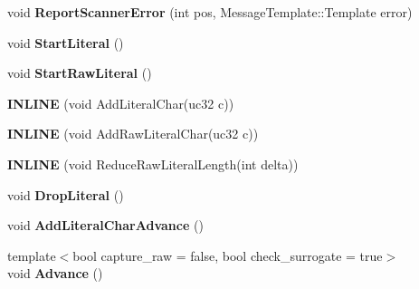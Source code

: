 \begin{DoxyCompactItemize}
\item 
void {\bfseries Report\+Scanner\+Error} (int pos, Message\+Template\+::\+Template error)\hypertarget{classv8_1_1internal_1_1_scanner_a804164d17098a4f357f2f67b0043c6aa}{}\label{classv8_1_1internal_1_1_scanner_a804164d17098a4f357f2f67b0043c6aa}

\item 
void {\bfseries Start\+Literal} ()\hypertarget{classv8_1_1internal_1_1_scanner_ac8091e0cf0fed8cfa51c626fa0cb4903}{}\label{classv8_1_1internal_1_1_scanner_ac8091e0cf0fed8cfa51c626fa0cb4903}

\item 
void {\bfseries Start\+Raw\+Literal} ()\hypertarget{classv8_1_1internal_1_1_scanner_a33bcfb5696e63e7afe9ce0d7261fc3af}{}\label{classv8_1_1internal_1_1_scanner_a33bcfb5696e63e7afe9ce0d7261fc3af}

\item 
{\bfseries I\+N\+L\+I\+NE} (void Add\+Literal\+Char(uc32 c))\hypertarget{classv8_1_1internal_1_1_scanner_adf7e3f741d064a21fe59bb83597496a0}{}\label{classv8_1_1internal_1_1_scanner_adf7e3f741d064a21fe59bb83597496a0}

\item 
{\bfseries I\+N\+L\+I\+NE} (void Add\+Raw\+Literal\+Char(uc32 c))\hypertarget{classv8_1_1internal_1_1_scanner_a55d9a8bcd08eba1320c650e71dc0e865}{}\label{classv8_1_1internal_1_1_scanner_a55d9a8bcd08eba1320c650e71dc0e865}

\item 
{\bfseries I\+N\+L\+I\+NE} (void Reduce\+Raw\+Literal\+Length(int delta))\hypertarget{classv8_1_1internal_1_1_scanner_a0974013915b54b2c323b1bed1894a3ae}{}\label{classv8_1_1internal_1_1_scanner_a0974013915b54b2c323b1bed1894a3ae}

\item 
void {\bfseries Drop\+Literal} ()\hypertarget{classv8_1_1internal_1_1_scanner_ab513c42742b0025b3b4f59537fd5ca0f}{}\label{classv8_1_1internal_1_1_scanner_ab513c42742b0025b3b4f59537fd5ca0f}

\item 
void {\bfseries Add\+Literal\+Char\+Advance} ()\hypertarget{classv8_1_1internal_1_1_scanner_ac0cebc03a584a5bf5b74b4f3ff2b168b}{}\label{classv8_1_1internal_1_1_scanner_ac0cebc03a584a5bf5b74b4f3ff2b168b}

\item 
{\footnotesize template$<$bool capture\+\_\+raw = false, bool check\+\_\+surrogate = true$>$ }\\void {\bfseries Advance} ()\hypertarget{classv8_1_1internal_1_1_scanner_a28c7c353d8dea581614c19de8be2affd}{}\label{classv8_1_1internal_1_1_scanner_a28c7c353d8dea581614c19de8be2affd}


\end{DoxyCompactItemize}
